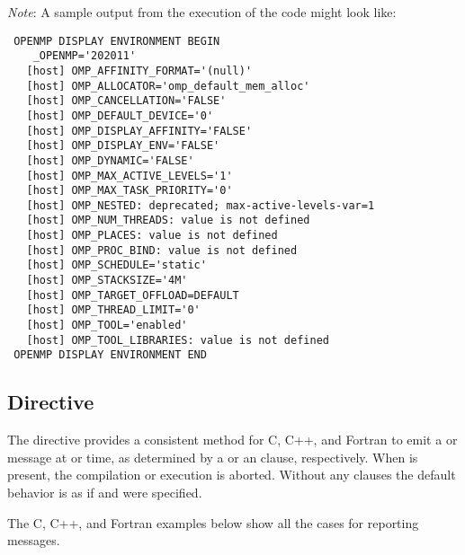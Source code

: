 
\clearpage

\emph{Note}: 
A sample output from the execution of the code might look like:
{\small\begin{verbatim}
 OPENMP DISPLAY ENVIRONMENT BEGIN
    _OPENMP='202011'
   [host] OMP_AFFINITY_FORMAT='(null)'
   [host] OMP_ALLOCATOR='omp_default_mem_alloc'
   [host] OMP_CANCELLATION='FALSE'
   [host] OMP_DEFAULT_DEVICE='0'
   [host] OMP_DISPLAY_AFFINITY='FALSE'
   [host] OMP_DISPLAY_ENV='FALSE'
   [host] OMP_DYNAMIC='FALSE'
   [host] OMP_MAX_ACTIVE_LEVELS='1'
   [host] OMP_MAX_TASK_PRIORITY='0'
   [host] OMP_NESTED: deprecated; max-active-levels-var=1
   [host] OMP_NUM_THREADS: value is not defined
   [host] OMP_PLACES: value is not defined
   [host] OMP_PROC_BIND: value is not defined
   [host] OMP_SCHEDULE='static'
   [host] OMP_STACKSIZE='4M'
   [host] OMP_TARGET_OFFLOAD=DEFAULT
   [host] OMP_THREAD_LIMIT='0'
   [host] OMP_TOOL='enabled'
   [host] OMP_TOOL_LIBRARIES: value is not defined
 OPENMP DISPLAY ENVIRONMENT END
\end{verbatim}}


\subsection{ Directive}
\label{subsec:error}

The  directive provides a consistent method for C, C++, and Fortran to emit a  or
 message at  or  time, as determined by a  
or an  clause, respectively. When  is present, the compilation 
or execution is aborted. Without any clauses the default behavior is as if  
and  were specified.

The C, C++, and Fortran examples below show all the cases for reporting messages.



